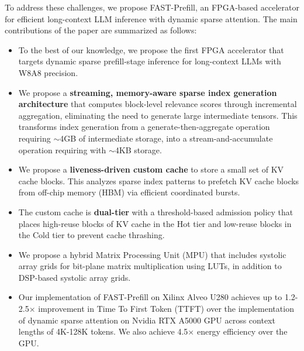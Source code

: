 \documentclass[conference]{IEEEtran}
\begin{document}
To address these challenges, we propose FAST-Prefill, an FPGA-based accelerator for efficient long-context LLM inference with dynamic sparse attention. The main contributions of the paper are summarized as follows:
\begin{itemize}
    \item To the best of our knowledge, we propose the first FPGA accelerator that targets dynamic sparse prefill-stage inference for long-context LLMs with W8A8 precision.
    \item We propose a \textbf{streaming, memory-aware sparse index generation architecture} that computes block-level relevance scores through incremental aggregation, eliminating the need to generate large intermediate tensors. This transforms index generation from a generate-then-aggregate operation requiring $\sim$4GB of intermediate storage, into a stream-and-accumulate operation requiring with $\sim$4KB storage. 
    \item We propose a \textbf{liveness-driven custom cache} to store a small set of KV cache blocks. This analyzes sparse index patterns to prefetch KV cache blocks from off-chip memory (HBM) via efficient coordinated bursts.
    \item The custom cache is \textbf{dual-tier} with a threshold-based admission policy that places high-reuse blocks of KV cache in the Hot tier and low-reuse blocks in the Cold tier to prevent cache thrashing.
    \item We propose a hybrid Matrix Processing Unit (MPU) that includes systolic array grids for bit-plane matrix multiplication using LUTs, in addition to DSP-based systolic array grids. 
    \item Our implementation of FAST-Prefill on Xilinx Alveo U280 achieves up to 1.2-2.5$\times$ improvement in Time To First Token (TTFT) over the implementation of dynamic sparse attention on Nvidia RTX A5000 GPU across context lengths of 4K-128K tokens. We also achieve 4.5$\times$ energy efficiency over the GPU.
\end{itemize}
\end{document}
